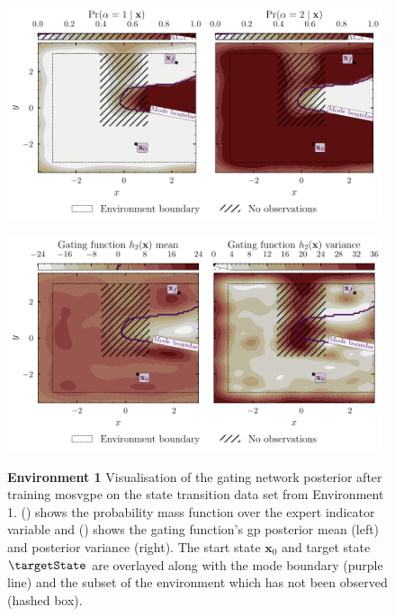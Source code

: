 \documentclass{mimosis-class/mimosis}
\numberwithin{equation}{chapter}
\newcommand{\state}{\ensuremath{\mathbf{x}}}
\begin{document}
{\begin{figure}[h!]
\centering
\begin{minipage}[r]{\columnwidth}
\centering
\includegraphics[width=0.98\textwidth]{./images/mode-opt/env/scenario_7/mosvgpe/mixing_probs_no_obs.pdf}
\label{eq-traj-opt-gating-network-prob-post-7}
\end{minipage}
\begin{minipage}{1.0\textwidth}
\centering
\includegraphics[width=0.98\textwidth]{./images/mode-opt/env/scenario_7/mosvgpe/desired_gating_gp_no_obs.pdf}
\label{eq-traj-opt-gating-network-gp-post-7}
\end{minipage}
\caption[Environment 1 gating network posterior]{\textbf{Environment 1} Visualisation of the gating network posterior after training \acrshort{mosvgpe}
on the state transition data set from Environment 1.
() shows the probability mass function over the expert indicator
variable and () shows the gating function's \acrshort{gp}
posterior mean (left) and posterior variance (right).
The start state $\state_0$ and target state $\targetState$ are overlayed along with the mode boundary (purple line)
and the subset of the environment which has not been observed (hashed box).}
\label{fig-traj-opt-gating-network-7}
\end{figure}

}
\end{document}
